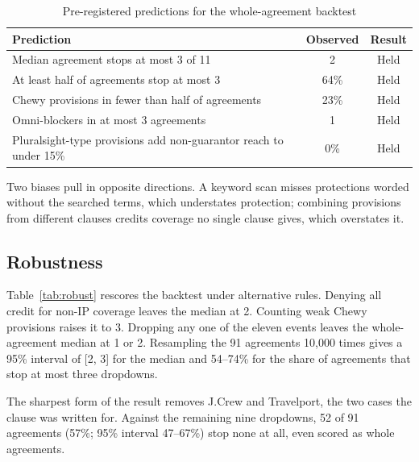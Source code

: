 \documentclass[12pt]{article}
\begin{document}
\begin{table}[!htbp]\centering
\begin{threeparttable}
\caption{Pre-registered predictions for the whole-agreement backtest}\label{tab:prereg}
\begin{tabularx}{0.9\linewidth}{Lcc}
\toprule
Prediction & Observed & Result\\\midrule
Median agreement stops at most 3 of 11 & 2 & Held\\
At least half of agreements stop at most 3 & 64\% & Held\\
Chewy provisions in fewer than half of agreements & 23\% & Held\\
Omni-blockers in at most 3 agreements & 1 & Held\\
Pluralsight-type provisions add non-guarantor reach to under 15\% & 0\% & Held\\
\bottomrule
\end{tabularx}
\end{threeparttable}
\end{table}

Two biases pull in opposite directions. A keyword scan misses protections worded without the searched terms, which understates protection; combining provisions from different clauses credits coverage no single clause gives, which overstates it.

\subsection{Robustness}\label{sec:robust}
Table~\ref{tab:robust} rescores the backtest under alternative rules. Denying all credit for non-IP coverage leaves the median at 2. Counting weak Chewy provisions raises it to 3. Dropping any one of the eleven events leaves the whole-agreement median at 1 or 2. Resampling the 91 agreements 10,000 times gives a 95\% interval of [2, 3] for the median and 54--74\% for the share of agreements that stop at most three dropdowns.

The sharpest form of the result removes J.Crew and Travelport, the two cases the clause was written for. Against the remaining nine dropdowns, 52 of 91 agreements (57\%; 95\% interval 47--67\%) stop none at all, even scored as whole agreements.
\end{document}
